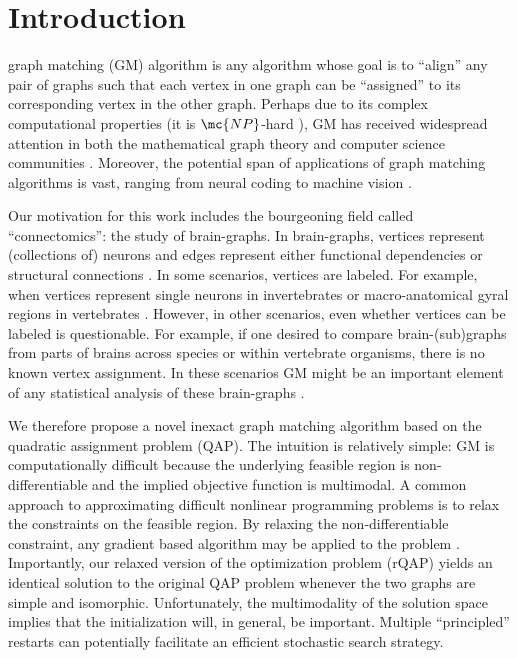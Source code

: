 \documentclass[10pt,journal,cspaper,compsoc]{IEEEtran}
\begin{document}
\section{Introduction}


 graph matching (GM) algorithm is any algorithm whose goal is to ``align'' any pair of graphs such that each vertex in one graph can be ``assigned'' to its corresponding vertex in the other graph.  Perhaps due to its complex computational properties (it is $\mc{NP}$-hard \cite{Garey1979}), GM has received widespread attention in both the mathematical graph theory and computer science communities \cite{Conte2004}.  Moreover, the potential span of applications of graph matching algorithms is vast, ranging from neural coding \cite{Richiardi2010} to machine vision \cite{Wiskott1997}.  

Our motivation for this work includes the bourgeoning field called ``connectomics'': the study of brain-graphs.  In brain-graphs,  vertices represent (collections of) neurons and edges represent either functional dependencies or structural connections \cite{Sporns2010}.  In some scenarios, vertices are labeled.  For example, when vertices represent single neurons in invertebrates \cite{WhiteBrenner86} or macro-anatomical gyral regions in vertebrates \cite{Biswal2010,Bullmore2010}.  However, in other scenarios, even whether vertices can be labeled is questionable.  For example, if one desired to compare brain-(sub)graphs from parts of brains across species or within vertebrate organisms, there is no known vertex assignment.  In these scenarios GM might be an important element of any statistical analysis of these brain-graphs \cite{VP11_sigsub, VP11_unlabeled}.


We therefore propose a novel inexact graph matching algorithm based on the quadratic assignment problem (QAP).  The intuition is relatively simple: GM is computationally difficult because the underlying feasible region is non-differentiable and the implied objective function is multimodal.  A common approach to approximating difficult nonlinear programming problems is to relax the constraints on the feasible region.  By relaxing the non-differentiable constraint, any gradient based algorithm may be applied to the problem \cite{Mangasarian1987}. Importantly, our relaxed version of the optimization problem (rQAP) yields an identical solution to the original QAP problem whenever the two graphs are simple and isomorphic. Unfortunately, the multimodality of the solution space implies that the initialization will, in general, be important.  Multiple ``principled'' restarts can potentially facilitate an efficient stochastic search strategy.  
\end{document}
